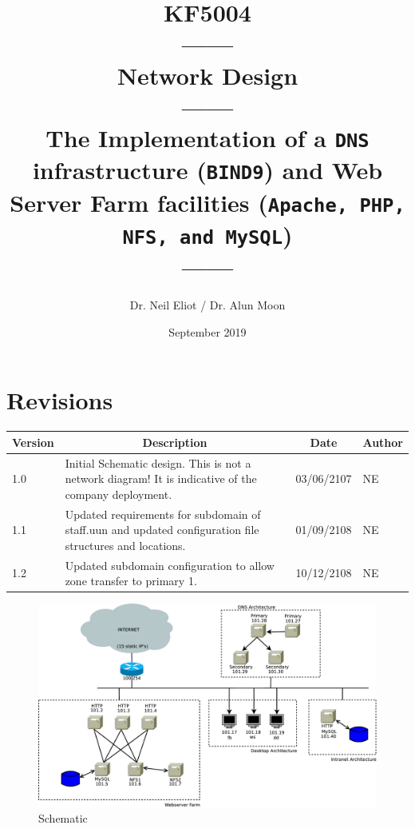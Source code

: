\documentclass[11pt]{article}
\begin{document}
\author{Dr. Neil Eliot / Dr. Alun Moon}
\title{KF5004\\------\\Network Design\\------\\The Implementation of a \texttt{DNS} infrastructure (\texttt{BIND9}) and Web Server Farm facilities
(\texttt{Apache, PHP, NFS, and MySQL})\\------}
\date{September 2019}
\maketitle

\newpage
\tableofcontents
\newpage

\section{Revisions}
\begin{table}[ht]
    \begin{tabular}{|p{1.5cm}|p{11cm}|p{2cm}|p{1.5cm}|} 
      \hline
      \multicolumn{1}{|c|}{Version} & \multicolumn{1}{|c|}{Description} & \multicolumn{1}{|c|}{Date}& \multicolumn{1}{|c|}{Author} \\ 
      \hline
      1.0 & Initial Schematic design. This is not a network diagram! It is indicative of the company deployment.& 03/06/2107 & NE\\
      \hline
      1.1 & Updated requirements for subdomain of staff.uun and updated configuration file structures and locations.& 01/09/2108 & NE\\
      \hline
      1.2 & Updated subdomain configuration to allow zone transfer to primary 1.& 10/12/2108 & NE\\
      \hline
    \end{tabular}
\end{table}
\newpage

\begin{landscape}
        \begin{figure}
        \begin{center}
            \includegraphics[width=1\linewidth]{Schematic.png}
            \caption{Schematic}
        \end{center}
      \end{figure}
\end{landscape}
\end{document}
